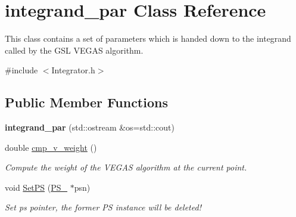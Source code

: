 \hypertarget{classintegrand__par}{}\section{integrand\+\_\+par Class Reference}
\label{classintegrand__par}


This class contains a set of parameters which is handed down to the integrand called by the G\+S\+L V\+E\+G\+A\+S algorithm.  




{\ttfamily \#include $<$Integrator.\+h$>$}

\subsection*{Public Member Functions}
\begin{DoxyCompactItemize}
\item 
\hypertarget{classintegrand__par_a91beb4d7cdba03603a3d95d46ee0621f}{}{\bfseries integrand\+\_\+par} (std\+::ostream \&os=std\+::cout)\label{classintegrand__par_a91beb4d7cdba03603a3d95d46ee0621f}

\item 
\hypertarget{classintegrand__par_aac7bdde6abcb8d81db5af3a24ce51f7d}{}double \hyperlink{classintegrand__par_aac7bdde6abcb8d81db5af3a24ce51f7d}{cmp\+\_\+v\+\_\+weight} ()\label{classintegrand__par_aac7bdde6abcb8d81db5af3a24ce51f7d}

\begin{DoxyCompactList}\small\item\em Compute the weight of the V\+E\+G\+A\+S algorithm at the current point. \end{DoxyCompactList}\item 
\hypertarget{classintegrand__par_a18a461b09009de0b9f8c6139994c52c4}{}void \hyperlink{classintegrand__par_a18a461b09009de0b9f8c6139994c52c4}{Set\+P\+S} (\hyperlink{classPS__2}{P\+S\+\_} $\ast$psn)\label{classintegrand__par_a18a461b09009de0b9f8c6139994c52c4}

\begin{DoxyCompactList}\small\item\em Set ps pointer, the former P\+S instance will be deleted! \end{DoxyCompactList}\end{DoxyCompactItemize}
